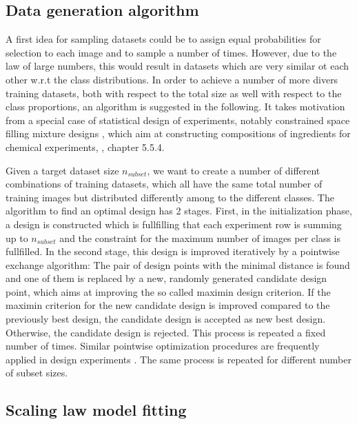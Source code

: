 \documentclass{article} %
\begin{document}
\subsection*{Data generation algorithm}

A first idea for sampling datasets could be to assign equal probabilities for selection to each image and to sample a number of times. However, due to the law of large numbers, 
this would result in datasets which are very similar ot each other w.r.t the class distributions. 
In order to achieve a number of more divers training datasets, both with respect to the total size as well with respect to the class proportions, an algorithm is suggested in the following.
It takes motivation from a special case of statistical design of experiments, notably constrained space filling mixture designs  \cite{gomes_hal_spacefilling_mixtures}, which aim at constructing compositions 
of ingredients for chemical experiments, \cite{Nist_2012_eng_stats}, chapter 5.5.4. 

Given a target dataset size $n_{subset}$, we want to create a number of different combinations of training datasets, which all 
have the same total number of training images but distributed differently among to the different classes.
The algorithm to find an optimal design has 2 stages. First, in the initialization phase, a design is constructed which is fullfilling that 
each experiment row is summing up to $n_{subset}$ and the constraint for the maximum number of images per class is fullfilled.
In the second stage, this design is improved iteratively by a pointwise exchange algorithm: The pair of design points with the minimal distance is found and one of them is 
replaced by a new, randomly generated candidate design point, which aims at improving the so called maximin design criterion.
If the maximin criterion for the new candidate design is improved compared to the previously best design, the candidate design is accepted as new best design.
Otherwise, the candidate design is rejected. This process is repeated a fixed number of times. Similar pointwise optimization procedures are frequently applied in design experiments \cite{fedorov1972theory}.
The same process is repeated for different number of subset sizes.

\subsection*{Scaling law model fitting}
\end{document}
